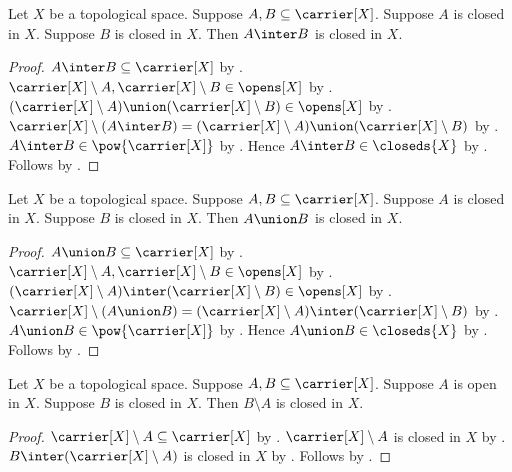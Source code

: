 \begin{proposition}\label{intersection_of_closed_is_closed}
    Let $X$ be a topological space.
    Suppose $A, B \subseteq \carrier[X]$.
    Suppose $A$ is closed in $X$.
    Suppose $B$ is closed in $X$.
    Then $A \inter B$ is closed in $X$.
\end{proposition}
\begin{proof}
    $A\inter B\subseteq\carrier[X]$ by .
    $\carrier[X] \setminus A, \carrier[X] \setminus B \in \opens[X]$
        by .
    $(\carrier[X] \setminus A) \union (\carrier[X] \setminus B)
        \in \opens[X]$ by .
    $\carrier[X]\setminus(A\inter B)
        =(\carrier[X]\setminus A)\union(\carrier[X]\setminus B)$
        by .
    $A\inter B\in\pow{\carrier[X]}$ by .
    Hence $A\inter B\in\closeds{X}$ by .
    Follows by .
\end{proof}

\begin{proposition}\label{union_of_closed_is_closed}
    Let $X$ be a topological space.
    Suppose $A, B \subseteq \carrier[X]$.
    Suppose $A$ is closed in $X$.
    Suppose $B$ is closed in $X$.
    Then $A \union B$ is closed in $X$.
\end{proposition}
\begin{proof}
    $A\union B\subseteq\carrier[X]$ by .
    $\carrier[X] \setminus A, \carrier[X] \setminus B \in \opens[X]$
        by .
    $(\carrier[X] \setminus A) \inter (\carrier[X] \setminus B)
        \in \opens[X]$ by .
    $\carrier[X]\setminus(A\union B)
        =(\carrier[X]\setminus A)\inter(\carrier[X]\setminus B)$
        by .
    $A\union B\in\pow{\carrier[X]}$ by .
    Hence $A\union B\in\closeds{X}$ by .
    Follows by .
\end{proof}

\begin{proposition}\label{closed_minus_open_is_closed}
    Let $X$ be a topological space.
    Suppose $A, B \subseteq \carrier[X]$.
    Suppose $A$ is open in $X$.
    Suppose $B$ is closed in $X$.
    Then $B \setminus A$ is closed in $X$.
\end{proposition}
\begin{proof}
    $\carrier[X]\setminus A\subseteq\carrier[X]$
        by .
    $\carrier[X]\setminus A$ is closed in $X$
        by .
    $B\inter(\carrier[X]\setminus A)$ is closed in $X$
        by .
    Follows by .
\end{proof}



